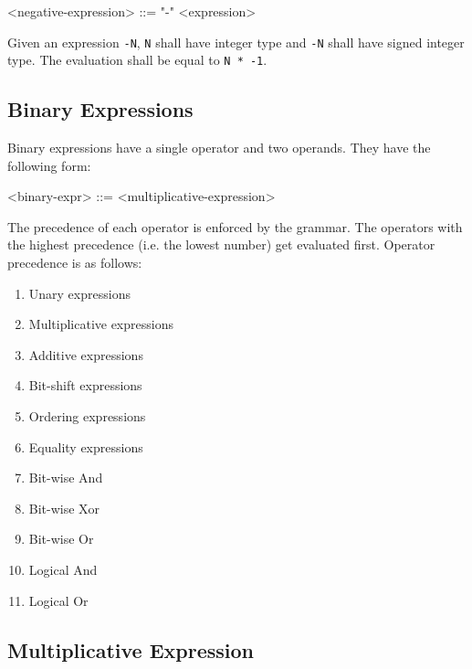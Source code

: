 \begin{minip}
\begin{grammar}
<negative-expression> ::= "-" <expression>
\end{grammar}
\end{minip}

Given an expression \texttt{-N}, \texttt{N} shall have integer type and \texttt{-N} shall have signed integer type. The evaluation shall be equal to \texttt{N * -1}.

\subsection{Binary Expressions} \label{guide:binary_expr}

Binary expressions have a single operator and two operands. They have the following form:

\begin{minip}
\begin{grammar}
<binary-expr> ::= <multiplicative-expression>
\end{grammar}
\end{minip}

The precedence of each operator is enforced by the grammar. The operators with the highest precedence (i.e. the lowest number) get evaluated first. Operator precedence is as follows:

\begin{enumerate}
\singlespacing
\item Unary expressions
\item Multiplicative expressions
\item Additive expressions
\item Bit-shift expressions
\item Ordering expressions
\item Equality expressions
\item Bit-wise And
\item Bit-wise Xor
\item Bit-wise Or
\item Logical And
\item Logical Or
\end{enumerate}

\subsection{Multiplicative Expression} \label{guide:mult_expr}

